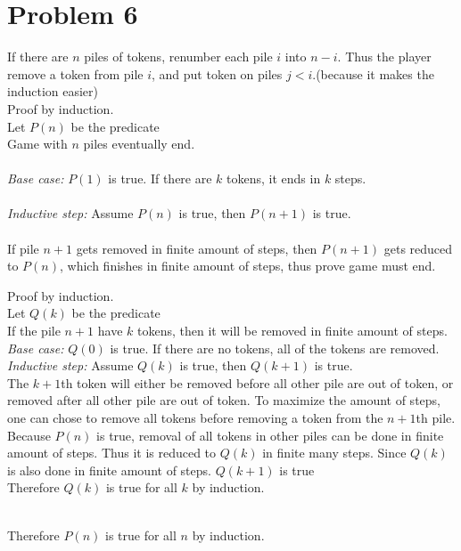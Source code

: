 \documentclass[letter]{article}
\begin{document}
\section*{Problem 6}
If there are $n$ piles of tokens, renumber each pile $i$ into $n-i$. Thus the player remove a token from pile $i$, and put token on piles $j<i$.(because it makes the induction easier)\\
Proof by induction.\\
Let $P(n)$ be the predicate\\
Game with $n$ piles eventually end.\\
 \\
\emph{Base case:} $P(1)$ is true. If there are $k$ tokens, it ends in $k$ steps.\\
 \\
\emph{Inductive step:} Assume $P(n)$ is true, then $P(n+1)$ is true.\\
\\
If pile $n+1$ gets removed in finite amount of steps, then $P(n+1)$ gets reduced to $P(n)$, which finishes in finite amount of steps, thus prove game must end.\\
\indent \indent  \parbox[t]{6in}{

Proof by induction.\\
Let $Q(k)$ be the predicate\\
If the pile $n+1$ have $k$ tokens, then it will be removed in finite amount of steps.\\

 \emph{Base case:} $Q(0)$ is true. If there are no tokens, all of the tokens are removed.\\

 \emph{Inductive step:} Assume $Q(k)$ is true, then $Q(k+1)$ is true.\\

The $k+1$th token will either be removed before all other pile are out of token, or removed after all other pile are out of token. To maximize the amount of steps, one can chose to remove all tokens before removing a token from the $n+1$th pile. Because $P(n)$ is true, removal of all tokens in other piles can be done in finite amount of steps. Thus it is reduced to $Q(k)$ in finite many steps. Since $Q(k)$ is also done in finite amount of steps. $Q(k+1)$ is true\\
Therefore $Q(k)$ is true for all $k$ by induction.\\

}\\
Therefore $P(n)$ is true for all $n$ by induction.
\end{document}
